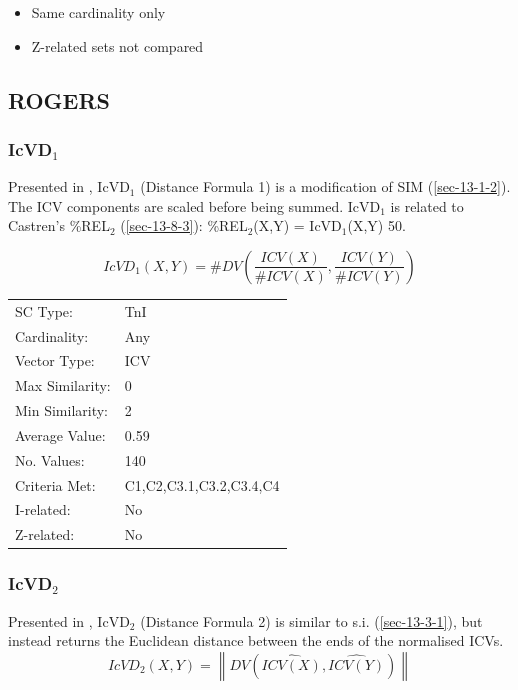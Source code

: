\documentclass{article}
\begin{document}
\begin{itemize}
\item Same cardinality only
\item Z-related sets not compared
\end{itemize}
\subsection{ROGERS}
\label{sec-13-4}
\subsubsection{IcVD$_{1}$}
\label{sec-13-4-1}

Presented in \citet{Rogers1992}, IcVD$_{1}$ (Distance Formula 1) is a
modification of SIM (\ref{sec-13-1-2}). The ICV components are scaled before being
summed. IcVD$_{1}$ is related to Castren's \%REL$_{2}$ (\ref{sec-13-8-3}):
\%REL$_{2}$(X,Y) = IcVD$_{1}$(X,Y)\texttimes{} 50.  

$$IcVD_{1}(X,Y)=\#DV\left(\frac{ICV(X)}{\#ICV(X)},\frac{ICV(Y)}{\#ICV(Y)}\right)$$


\begin{center}
\begin{tabular}{ll}
 SC Type:         &  TnI                      \\
 Cardinality:     &  Any                      \\
 Vector Type:     &  ICV                      \\
 Max Similarity:  &  0                        \\
 Min Similarity:  &  2                        \\
 Average Value:   &  0.59                     \\
 No. Values:      &  140                      \\
 Criteria Met:    &  C1,C2,C3.1,C3.2,C3.4,C4  \\
 I-related:       &  No                       \\
 Z-related:       &  No                       \\
\end{tabular}
\end{center}
\subsubsection{IcVD$_{2}$}
\label{sec-13-4-2}

Presented in \citet{Rogers1992}, IcVD$_{2}$ (Distance Formula 2) is
similar to s.i. (\ref{sec-13-3-1}), but instead returns the Euclidean distance
between the ends of the normalised ICVs.
$$IcVD_{2}(X,Y)=\left\|DV(\hat{ICV(X)},\hat{ICV(Y)})\right\|$$
\end{document}
